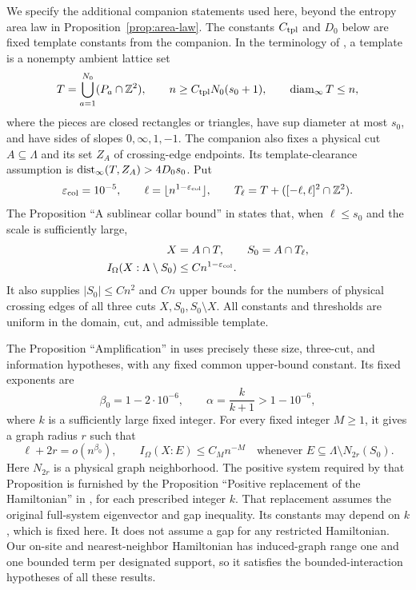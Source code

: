 We specify the additional companion statements used here, beyond the
entropy area law in Proposition~\ref{prop:area-law}.  The constants
$C_{\rm tpl}$ and $D_0$ below are fixed template constants from the companion.
In the terminology
of \cite[Sections~9 and~10]{RepoAreaLaw}, a template is a nonempty ambient
lattice set
\[
 T=\bigcup_{a=1}^{N_0}(P_a\cap\mathbb Z^2),
 \qquad
 n\ge C_{\rm tpl}N_0(s_0+1),
 \qquad \operatorname{diam}_\infty T\le n,
\]
where the pieces are closed rectangles or triangles, have sup diameter
at most $s_0$, and have sides of slopes $0,\infty,1,-1$.  The companion also
fixes a physical cut $A\subseteq\Lambda$ and its set $Z_A$ of
crossing-edge endpoints.  Its template-clearance assumption is
$\operatorname{dist}_\infty(T,Z_A)>4D_0s_0$.  Put
\[
 \varepsilon_{\rm col}=10^{-5},\qquad
 \ell=\lfloor n^{1-\varepsilon_{\rm col}}\rfloor,
 \qquad T_\ell=T+([-\ell,\ell]^2\cap\mathbb Z^2).
\]
The Proposition ``A sublinear collar bound'' in
\cite[Section~9]{RepoAreaLaw} states that, when $\ell\le s_0$ and the
scale is sufficiently large,
\begin{equation}
 \begin{split}
 X&=A\cap T,\qquad S_0=A\cap T_\ell,\\
 I_\Omega(X:\Lambda\setminus S_0)&\le Cn^{1-\varepsilon_{\rm col}}.
 \end{split}
 \label{eq:info-repository-collar}
\end{equation}
It also supplies $|S_0|\le Cn^2$ and $Cn$ upper bounds for the numbers
of physical crossing edges of all three cuts $X,S_0,S_0\setminus X$.
All constants and thresholds are uniform in the domain, cut, and
admissible template.

The Proposition ``Amplification'' in \cite[Section~10]{RepoAreaLaw}
uses precisely these size, three-cut, and information hypotheses, with
any fixed common upper-bound constant.  Its fixed exponents are
\[
 \beta_0=1-2\cdot10^{-6},\qquad
 \alpha=\frac{k}{k+1}>1-10^{-6},
\]
where $k$ is a sufficiently large fixed integer.  For every fixed integer
$M\ge1$, it gives a graph radius $r$ such that
\begin{equation}
 \ell+2r=o(n^{\beta_0}),\qquad
 I_\Omega(X:E)\le C_Mn^{-M}
 \quad\text{whenever }E\subseteq\Lambda\setminus N_{2r}(S_0).
 \label{eq:info-repository-amplification}
\end{equation}
Here $N_{2r}$ is a physical graph neighborhood.  The positive system
required by that Proposition is furnished by the Proposition ``Positive
replacement of the Hamiltonian'' in \cite[Section~4]{RepoAreaLaw}, for
each prescribed integer $k$.  That replacement assumes the original
full-system eigenvector and gap inequality.  Its constants may depend
on $k$, which is fixed here.  It does not assume a gap for any restricted
Hamiltonian.  Our on-site and nearest-neighbor Hamiltonian has
induced-graph range one and one bounded term per designated support, so
it satisfies the bounded-interaction hypotheses of all these results.

